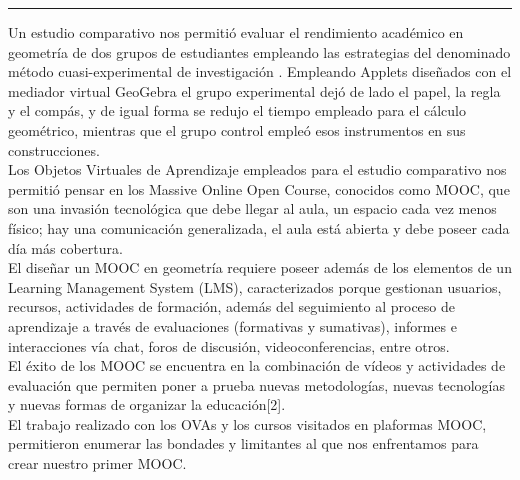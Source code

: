 \begin{titlepage}
\begin{minipage}{0.5\linewidth}
\begin{minipage}{0.45\linewidth}
    \begin{flushright}
        \printauthor
    \end{flushright}
\end{minipage} \hspace{-3pt}
%
\begin{minipage}{0.02\linewidth}
   \color{ptctitle} \rule{1pt}{225pt}
\end{minipage} 
\end{minipage}
\hspace*{-4.5cm}
\begin{minipage}{0.85\linewidth}
\begin{minipage}{0.85\linewidth}
\footnotesize
\vspace{5pt}
    \begin{resumen}
    Un estudio comparativo nos permiti\'{o} evaluar el rendimiento acad\'{e}mico en geometr\'{i}a de dos grupos de estudiantes empleando las estrategias del denominado m\'{e}todo cuasi-experimental de investigaci\'on \cite{1}. Empleando Applets dise\~nados con el mediador virtual GeoGebra el grupo experimental dej\'{o} de lado el papel, la regla y el comp\'{a}s, y de igual forma se redujo el tiempo empleado para el c\'{a}lculo geom\'{e}trico, mientras que el grupo control emple\'{o} esos instrumentos en sus construcciones.\\
\indent
Los Objetos Virtuales de Aprendizaje empleados para el estudio comparativo nos permiti\'{o} pensar en los Massive Online Open Course, conocidos como  MOOC, que son una invasi\'{o}n tecnol\'{o}gica que debe llegar al aula, un espacio cada vez menos f\'{i}sico; hay una comunicaci\'{o}n generalizada, el aula est\'{a} abierta y debe poseer cada d\'{i}a m\'{a}s cobertura.\\
\indent
El dise\~nar un MOOC en geometr\'{i}a requiere poseer adem\'{a}s de los elementos de un Learning Management System (LMS), caracterizados porque gestionan usuarios, recursos, actividades de formaci\'{o}n, adem\'{a}s del seguimiento al proceso de aprendizaje a trav\'{e}s de evaluaciones (formativas y sumativas), informes e interacciones v\'{i}a chat, foros de discusi\'{o}n, videoconferencias, entre otros. \\
\indent
El \'{e}xito de los MOOC se encuentra en la combinaci\'{o}n de v\'{i}deos y actividades de evaluaci\'{o}n que permiten poner a prueba nuevas metodolog\'{i}as, nuevas tecnolog\'{i}as y nuevas formas de organizar la educaci\'{o}n[2].\\
\indent
El trabajo realizado con los OVAs y los cursos visitados en plaformas MOOC, permitieron enumerar las bondades y limitantes al que nos enfrentamos para crear nuestro primer MOOC.


\end{resumen}
\end{minipage}
\end{minipage}
\end{titlepage}
